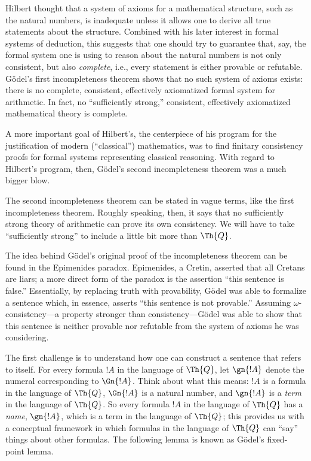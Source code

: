 \documentclass[../../include/open-logic-section]{subfiles}
\begin{document}


Hilbert thought that a system of axioms for a mathematical structure,
such as the natural numbers, is inadequate unless it allows one to
derive all true statements about the structure. Combined with his
later interest in formal systems of deduction, this suggests that one
should try to guarantee that, say, the formal system one is using to
reason about the natural numbers is not only consistent, but also
\emph{complete}, i.e., every statement is either provable or
refutable. G\"odel's first incompleteness theorem shows that no such
system of axioms exists: there is no complete, consistent, effectively
axiomatized formal system for arithmetic.  In fact, no ``sufficiently
strong,'' consistent, effectively axiomatized mathematical theory is
complete.

A more important goal of Hilbert's, the centerpiece of his program for
the justification of modern (``classical'') mathematics, was to find
finitary consistency proofs for formal systems representing classical
reasoning.  With regard to Hilbert's program, then, G\"odel's second
incompleteness theorem was a much bigger blow.

The second incompleteness theorem can be stated in vague terms, like
the first incompleteness theorem. Roughly speaking, then, it says that
no sufficiently strong theory of arithmetic can prove its own
consistency. We will have to take ``sufficiently strong'' to include a
little bit more than $\Th{Q}$.

The idea behind G\"odel's original proof of the incompleteness theorem
can be found in the Epimenides paradox. Epimenides, a Cretin, asserted
that all Cretans are liars; a more direct form of the paradox is the
assertion ``this sentence is false.'' Essentially, by replacing truth
with provability, G\"odel was able to formalize a sentence which, in
essence, asserts ``this sentence is not provable.'' Assuming
$\omega$-consistency---a property stronger than consistency---G\"odel
was able to show that this sentence is neither provable nor refutable
from the system of axioms he was considering.

The first challenge is to understand how one can construct a sentence
that refers to itself. For every formula $!A$ in the language of $\Th{Q}$,
let $\gn{!A}$ denote the numeral corresponding to $\Gn{!A}$. Think
about what this means: $!A$ is a formula in the language of $\Th{Q}$,
$\Gn{!A}$ is a natural number, and $\gn{!A}$ is a \emph{term} in the
language of $\Th{Q}$. So every formula $!A$ in the language of $\Th{Q}$ has a
\emph{name}, $\gn{!A}$, which is a term in the language of $\Th{Q}$; this
provides us with a conceptual framework in which formulas in the
language of $\Th{Q}$ can ``say'' things about other formulas. The following
lemma is known as G\"odel's fixed-point lemma.
\end{document}
